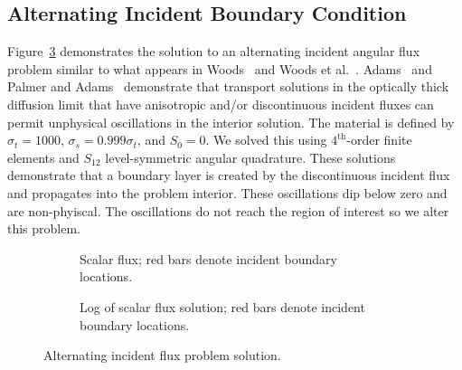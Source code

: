 \documentclass{article}
\begin{document}
\subsection{Alternating Incident Boundary Condition}
Figure~\ref{fig:AlternatingIncident3PointQ4Q3R1} demonstrates the solution to an alternating incident angular flux problem similar to what appears in Woods~\cite{WoodsThesis} and Woods et al.~\cite{WoodsHoDgfemXyCurved}. Adams~\cite{AdamsDFEMDiffLimit} and Palmer and Adams~\cite{PalmerCurvilinearTransport} demonstrate that transport solutions in the optically thick diffusion limit that have anisotropic and/or discontinuous incident fluxes can permit unphysical oscillations in the interior solution. The material is defined by $\sigma_t=1000$, $\sigma_s=0.999 \sigma_t$, and $S_0=0$. We solved this using $4^\text{th}$-order finite elements and $S_{12}$ level-symmetric angular quadrature. These solutions demonstrate that a boundary layer is created by the discontinuous incident flux and propagates into the problem interior. These oscillations dip below zero and are non-phyiscal. The oscillations do not reach the region of interest so we alter this problem.

\begin{figure}[!htb]
\centering
\begin{subfigure}{\textwidth}
\centering
{}
\caption{Scalar flux; red bars denote incident boundary locations.}
\label{subfig:AlternatingIncident3PointQ4Q3R1}
\end{subfigure}
\begin{subfigure}{\textwidth}
\centering
{}
\caption{Log of scalar flux solution; red bars denote incident boundary locations.}
\label{subfig:AlternatingIncident3PointQ4Q3R1log}
\end{subfigure}
\caption{Alternating incident flux problem solution.}
\label{fig:AlternatingIncident3PointQ4Q3R1}
\end{figure}
\end{document}
